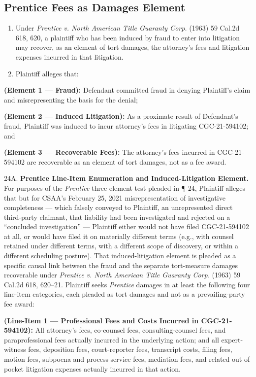 \subsection{Prentice Fees as Damages Element}\label{prentice-fees-as-damages-element}

\begin{enumerate}
\def\labelenumi{\arabic{enumi}.}
\setcounter{enumi}{22}
\item
  Under \emph{Prentice v. North American Title Guaranty Corp.} (1963) 59 Cal.2d 618, 620, a plaintiff who has been induced by fraud to enter into litigation may recover, as an element of tort damages, the attorney's fees and litigation expenses incurred in that litigation.
\item
  Plaintiff alleges that:
\end{enumerate}

\textbf{(Element 1 --- Fraud):} Defendant committed fraud in denying Plaintiff's claim and misrepresenting the basis for the denial;

\textbf{(Element 2 --- Induced Litigation):} As a proximate result of Defendant's fraud, Plaintiff was induced to incur attorney's fees in litigating CGC-21-594102; and

\textbf{(Element 3 --- Recoverable Fees):} The attorney's fees incurred in CGC-21-594102 are recoverable as an element of tort damages, not as a fee award.

24A. \textbf{Prentice Line-Item Enumeration and Induced-Litigation Element.} For purposes of the \emph{Prentice} three-element test pleaded in ¶ 24, Plaintiff alleges that but for CSAA's February 25, 2021 misrepresentation of investigative completeness --- which falsely conveyed to Plaintiff, an unrepresented direct third-party claimant, that liability had been investigated and rejected on a ``concluded investigation'' --- Plaintiff either would not have filed CGC-21-594102 at all, or would have filed it on materially different terms (e.g., with counsel retained under different terms, with a different scope of discovery, or within a different scheduling posture). That induced-litigation element is pleaded as a specific causal link between the fraud and the separate tort-measure damages recoverable under \emph{Prentice v. North American Title Guaranty Corp.} (1963) 59 Cal.2d 618, 620--21. Plaintiff seeks \emph{Prentice} damages in at least the following four line-item categories, each pleaded as tort damages and not as a prevailing-party fee award:

\textbf{(Line-Item 1 --- Professional Fees and Costs Incurred in CGC-21-594102):} All attorney's fees, co-counsel fees, consulting-counsel fees, and paraprofessional fees actually incurred in the underlying action; and all expert-witness fees, deposition fees, court-reporter fees, transcript costs, filing fees, motion-fees, subpoena and process-service fees, mediation fees, and related out-of-pocket litigation expenses actually incurred in that action.

